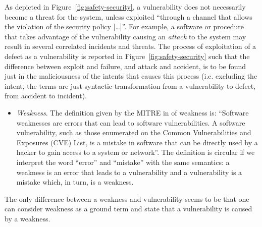 \documentclass[conference]{IEEEtran}
\begin{document}
As depicted in Figure~\ref{fig:safety-security}, a vulnerability does not
necessarily become a threat for the system, unless exploited ``through a
channel that allows the violation of the security policy
[\ldots]''\cite{cnssi20104009}. For example, a software or procedure that takes
advantage of the vulnerability causing an \emph{attack} to the system may
result in several correlated incidents and threats.  The process of
exploitation of a defect as a vulnerability is reported in
Figure~\ref{fig:safety-security} such that the difference between exploit and failure,
and attack and accident, is to be found just in the maliciousness of the intents
that causes this process (i.e. excluding the intent, the terms are just syntactic transformation from a vulnerability to defect, from
accident to incident). 

\begin{itemize}
	\item \emph{Weakness}. The definition given by the MITRE
		in \cite{MITRE2020CWEweakness} of weakness is: ``Software
		weaknesses are errors that can lead to software
		vulnerabilities. A software vulnerability, such as those
		enumerated on the Common Vulnerabilities and Exposures (CVE)
		List, is a mistake in software that can be directly used by a
		hacker to gain access to a system or network''.  The definition
		is circular if we interpret the word ``error'' and ``mistake''
		with the same semantics: a weakness is an error that leads to a
		vulnerability and a vulnerability is a mistake which, in turn,
		is a weakness.  
\end{itemize}

The only difference between a weakness and vulnerability seems to be that one
can consider weakness as a ground term and state that a vulnerability is caused
by a weakness.
\end{document}
